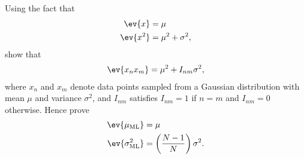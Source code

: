 \begin{question}{1.12}
	Using the fact that 
	\begin{align*}
		\ev{x} &= \mu\\
		\ev{x^2} &= \mu^2 + \sigma^2,
	\end{align*}
	show that
	\begin{align*}
		\ev{x_n x_m} = \mu^2 + I_{nm}\sigma^2,
	\end{align*}
	where $x_n$ and $x_m$ denote data points sampled from a Gaussian distribution with mean $\mu$ and variance $\sigma^2$, and $I_{nm}$ satisfies $I_{nm} = 1$ if $n = m$ and $I_{nm}=0$ otherwise. Hence prove
	\begin{align*}
		\ev{\mu_{\mathrm{ML}}} &= \mu\\
		\ev{\sigma^2_{\mathrm{ML}}} &= \left(\frac{N-1}{N}\right)\sigma^2.
	\end{align*}
\end{question}

